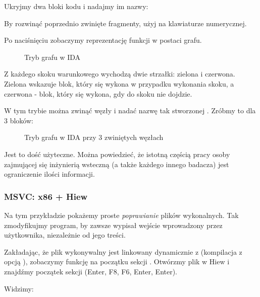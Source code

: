 Ukryjmy dwa bloki kodu i nadajmy im nazwy:



By rozwinąć poprzednio zwinięte fragmenty, użyj  na klawiaturze numerycznej.

\clearpage
Po naciśnięciu  zobaczymy reprezentację funkcji w postaci grafu.

\begin{figure}[H]
\centering
{}
\caption{Tryb grafu w IDA}
\label{fig:ex3_IDA_1}
\end{figure}

Z każdego skoku warunkowego wychodzą dwie strzałki: zielona i czerwona.
Zielona wskazuje blok, który się wykona w przypadku wykonania skoku, a czerwona - blok, który się wykona, gdy do skoku nie dojdzie.

\clearpage
W tym trybie można zwinąć węzły i nadać nazwę tak stworzonej .
Zróbmy to dla 3 bloków:

\begin{figure}[H]
\centering
{}
\caption{Tryb grafu w IDA przy 3 zwiniętych węzłach}
\label{fig:ex3_IDA_2}
\end{figure}

Jest to dość użyteczne.
Można powiedzieć, że istotną częścią pracy osoby zajmującej się inżynierią wsteczną (a także każdego innego badacza) jest ograniczenie ilości informacji.



\clearpage
\subsubsection{MSVC: x86 + Hiew}

Na tym przykładzie pokażemy proste \emph{poprawianie} plików wykonalnych.
Tak zmodyfikujmy program, by zawsze wypisał wejście wprowadzony przez użytkownika, niezależnie od jego treści.

Zakładając, że plik wykonywalny jest linkowany dynamicznie z  (kompilacja z opcją ),
zobaczymy funkcję \main na początku sekcji .
Otwórzmy plik w Hiew i znajdźmy początek sekcji  (Enter, F8, F6, Enter, Enter).

Widzimy:

